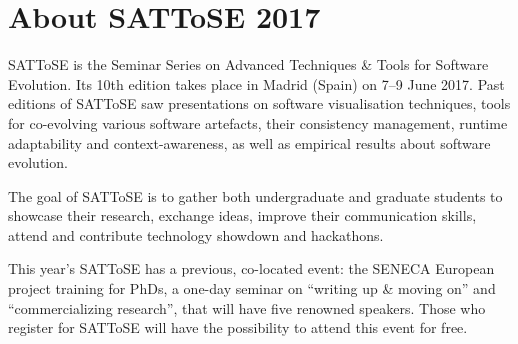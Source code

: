 \documentclass[12pt]{article}
\title{}
\author{}
\date{}
\begin{document}
\maketitle

\clearpage

\section*{About SATToSE 2017}
SATToSE is the Seminar Series on Advanced Techniques \& Tools for Software Evolution. Its 10th edition takes place in Madrid (Spain) on 7–9 June 2017. Past editions of SATToSE saw presentations on software visualisation techniques, tools for co-evolving various software artefacts, their consistency management, runtime adaptability and context-awareness, as well as empirical results about software evolution.

The goal of SATToSE is to gather both undergraduate and graduate students to showcase their research, exchange ideas, improve their communication skills, attend and contribute technology showdown and hackathons.

This year's SATToSE has a previous, co-located event: the SENECA European project training for PhDs, a one-day seminar on ``writing up \& moving on'' and ``commercializing research'', that will have five renowned speakers. Those who register for SATToSE will have the possibility to attend this event for free.
\end{document}
